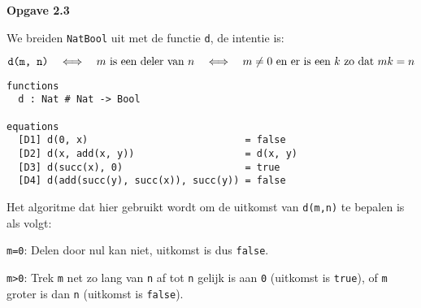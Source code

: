 \documentclass[a4paper,11pt]{article}
\begin{document}
{\bf Opgave 2.3} %

We breiden \verb|NatBool| uit met de functie \verb|d|, de intentie is:

\begin{displaymath}
\verb|d(m, n)| \quad \Longleftrightarrow \quad \mbox{$m$ is een deler van $n$} \quad \Longleftrightarrow \quad \mbox{$m \neq 0$ en er is een $k$ zo dat $m k = n$}
\end{displaymath}

\begin{verbatim}
functions
  d : Nat # Nat -> Bool

equations
  [D1] d(0, x)                           = false
  [D2] d(x, add(x, y))                   = d(x, y)
  [D3] d(succ(x), 0)                     = true
  [D4] d(add(succ(y), succ(x)), succ(y)) = false
\end{verbatim}

Het algoritme dat hier gebruikt wordt om de uitkomst van \verb|d(m,n)| te
bepalen is als volgt:

\begin{description}

\item{\verb|m=0|:}
Delen door nul kan niet, uitkomst is dus \verb|false|.

\item{\verb|m>0|:}
Trek \verb|m| net zo lang van \verb|n| af tot \verb|n| gelijk is aan \verb|0| (uitkomst is
\verb|true|), of \verb|m| groter is dan \verb|n| (uitkomst is \verb|false|).

\end{description}
\end{document}

